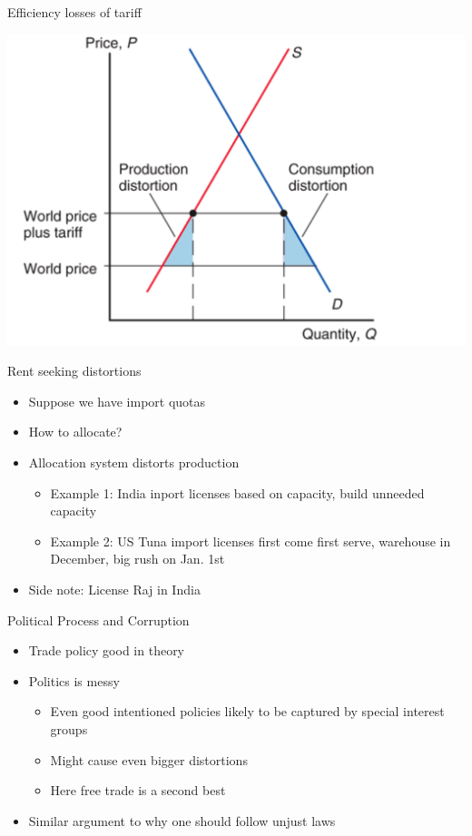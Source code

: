 \documentclass[10pt,hyperref={CJKbookmarks=true},xcolor=dvipsnames,aspectratio=169]{beamer}
\begin{document}
\begin{frame}{Efficiency losses of tariff}

\centering \includegraphics[scale=0.2]{fig/politic/tariff_distortion.png}

\end{frame}

\begin{frame}{Rent seeking distortions}

\begin{itemize}
\item Suppose we have import quotas
\item How to allocate?
\item Allocation system distorts production
\begin{itemize}
\item Example 1: India inport licenses based on capacity, build unneeded capacity
\item Example 2: US Tuna import licenses first come first serve, warehouse in December, big rush on Jan. 1st
\end{itemize}
\item Side note: License Raj in India
\end{itemize}

\end{frame}

\begin{frame}{Political Process and Corruption}

\begin{itemize}
\item Trade policy good in theory
\item Politics is messy
\begin{itemize}
\item Even good intentioned policies likely to be captured by special interest groups
\item Might cause even bigger distortions
\item Here free trade is a second best 
\end{itemize} 
\item Similar argument to why one should follow unjust laws
\end{itemize}

\end{frame}
\end{document}

